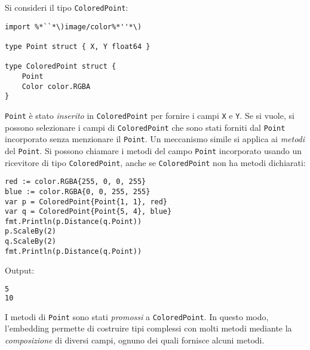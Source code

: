 %
Si consideri il tipo \verb|ColoredPoint|:
\begin{lstlisting}[frame=single, label={lst:lstlisting5-3.1}]
import %*``*\)image/color%*''*\)

type Point struct { X, Y float64 }

type ColoredPoint struct {
    Point
    Color color.RGBA
}
\end{lstlisting}
\verb|Point| è stato \textit{inserito} in \verb|ColoredPoint| per fornire i campi \verb|X| e \verb|Y|.
Se si vuole, si possono selezionare i campi di \verb|ColoredPoint| che sono stati forniti dal \verb|Point| incorporato senza menzionare il \verb|Point|.
Un meccanismo simile si applica ai \textit{metodi} del \verb|Point|.
Si possono chiamare i metodi del campo \verb|Point| incorporato usando un ricevitore di tipo \verb|ColoredPoint|, anche se \verb|ColoredPoint| non ha metodi dichiarati:
\begin{lstlisting}[frame=single, label={lst:lstlisting5-3.2}]
red := color.RGBA{255, 0, 0, 255}
blue := color.RGBA{0, 0, 255, 255}
var p = ColoredPoint{Point{1, 1}, red}
var q = ColoredPoint{Point{5, 4}, blue}
fmt.Println(p.Distance(q.Point))
p.ScaleBy(2)
q.ScaleBy(2)
fmt.Println(p.Distance(q.Point))
\end{lstlisting}
Output:
\begin{lstlisting}[language=bash, frame=L, label={lst:lstlisting5-3.3}]
5
10
\end{lstlisting}
I metodi di \verb|Point| sono stati \textit{promossi} a \verb|ColoredPoint|.
In questo modo, l'embedding permette di costruire tipi complessi con molti metodi mediante la \textit{composizione} di diversi campi, ognuno dei quali fornisce alcuni metodi.

